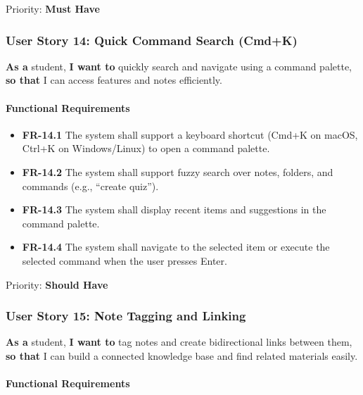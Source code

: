 \documentclass[12pt,a4paper]{article}
\begin{document}
Priority: \textbf{Must Have}

\subsubsection{User Story 14: Quick Command Search (Cmd+K)}

\textbf{As a} student, \textbf{I want to} quickly search and navigate using a command palette, \textbf{so that} I can access features and notes efficiently.

\paragraph{Functional Requirements}

\begin{itemize}
    \item \textbf{FR-14.1} The system shall support a keyboard shortcut (Cmd+K on macOS, Ctrl+K on Windows/Linux) to open a command palette.
    \item \textbf{FR-14.2} The system shall support fuzzy search over notes, folders, and commands (e.g., ``create quiz'').
    \item \textbf{FR-14.3} The system shall display recent items and suggestions in the command palette.
    \item \textbf{FR-14.4} The system shall navigate to the selected item or execute the selected command when the user presses Enter.
\end{itemize}

Priority: \textbf{Should Have}

\subsubsection{User Story 15: Note Tagging and Linking}

\textbf{As a} student, \textbf{I want to} tag notes and create bidirectional links between them, \textbf{so that} I can build a connected knowledge base and find related materials easily.

\paragraph{Functional Requirements}
\end{document}
